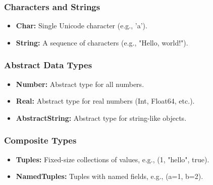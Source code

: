 \documentclass{report}
\begin{document}
    \bigbreak \noindent 
    \subsubsection{Characters and Strings}
    \begin{itemize}
        \item \textbf{Char:} Single Unicode character (e.g., 'a').
        \item \textbf{String:} A sequence of characters (e.g., "Hello, world!").
    \end{itemize}
    \bigbreak \noindent 
    \subsubsection{Abstract Data Types}
    \begin{itemize}
        \item \textbf{Number:} Abstract type for all numbers.
        \item \textbf{Real:} Abstract type for real numbers (Int, Float64, etc.).
        \item \textbf{AbstractString:} Abstract type for string-like objects.
    \end{itemize}
    \bigbreak \noindent 
    \subsubsection{Composite Types}
    \begin{itemize}
        \item \textbf{Tuples:} Fixed-size collections of values, e.g., (1, "hello", true).
        \item \textbf{NamedTuples:} Tuples with named fields, e.g., (a=1, b=2).
    \end{itemize}
    \bigbreak \noindent 
\end{document}
